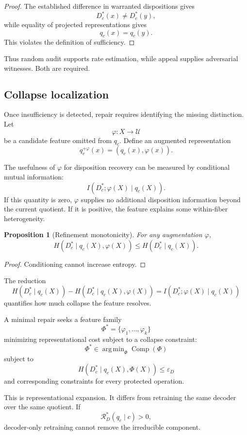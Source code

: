 \documentclass[11pt]{article}
\newtheorem{proposition}[definition]{Proposition}
\theoremstyle{definition}
\DeclareMathOperator{\argmin}{arg\,min}
\DeclareMathOperator{\Comp}{Comp}
\newcommand{\eps}{\varepsilon}
\begin{document}
\begin{proof}
The established difference in warranted dispositions gives
\[
D_c^{*}(x)\neq D_c^{*}(y),
\]
while equality of projected representations gives
\[
q_c(x)=q_c(y).
\]
This violates the definition of sufficiency.
\end{proof}

Thus random audit supports rate estimation, while appeal supplies adversarial witnesses. Both are required.

\subsection{Collapse localization}

Once insufficiency is detected, repair requires identifying the missing distinction. Let
\[
\varphi:X\to\mathcal U
\]
be a candidate feature omitted from \(q_c\). Define an augmented representation
\[
q_c^{+\varphi}(x)
=
(q_c(x),\varphi(x)).
\]

The usefulness of \(\varphi\) for disposition recovery can be measured by conditional mutual information:
\[
I(D_c^{*};\varphi(X)\mid q_c(X)).
\]
If this quantity is zero, \(\varphi\) supplies no additional disposition information beyond the current quotient. If it is positive, the feature explains some within-fiber heterogeneity.

\begin{proposition}[Refinement monotonicity]
For any augmentation \(\varphi\),
\[
H(D_c^{*}\mid q_c(X),\varphi(X))
\leq
H(D_c^{*}\mid q_c(X)).
\]
\end{proposition}

\begin{proof}
Conditioning cannot increase entropy.
\end{proof}

The reduction
\[
H(D_c^{*}\mid q_c(X))
-
H(D_c^{*}\mid q_c(X),\varphi(X))
=
I(D_c^{*};\varphi(X)\mid q_c(X))
\]
quantifies how much collapse the feature resolves.

A minimal repair seeks a feature family
\[
\Phi^{*}
=
\{\varphi_1,\ldots,\varphi_k\}
\]
minimizing representational cost subject to a collapse constraint:
\[
\Phi^{*}
\in
\argmin_{\Phi}
\Comp(\Phi)
\]
subject to
\[
H(D_c^{*}\mid q_c(X),\Phi(X))
\leq
\eps_D
\]
and corresponding constraints for every protected operation.

This is representational expansion. It differs from retraining the same decoder over the same quotient. If
\[
\mathcal R_D^{*}(q_c\mid c)>0,
\]
decoder-only retraining cannot remove the irreducible component.
\end{document}
